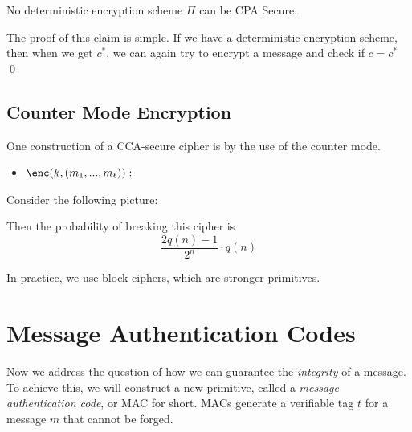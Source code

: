 \documentclass[12pt]{tufte-book}
\newcommand{\getsr}{\xleftarrow{\$}}
\begin{document}
\begin{theorem}
    No deterministic encryption scheme $\Pi$ can be CPA Secure.
\end{theorem}

\proof
The proof of this claim is simple.
If we have a deterministic encryption scheme, then when we get $c^*$, we can again try to encrypt a message and check if $c = c^*$
\qed


\subsection{Counter Mode Encryption}
One construction of a CCA-secure cipher is by the use of the counter mode.

\begin{itemize}
    \item $\enc(k, (m_1,...,m_\ell)):$
\end{itemize}

Consider the following picture:

\begin{center}
\end{center}

Then the probability of breaking this cipher is
$$\frac{2q(n) - 1}{2^n} \cdot q(n)$$

In practice, we use block ciphers, which are stronger primitives.

\section{Message Authentication Codes}
Now we address the question of how we can guarantee the \textit{integrity} of a message.
To achieve this, we will construct a new primitive, called a \textit{message authentication code}, or MAC for short. MACs generate a verifiable tag $t$ for a message $m$ that cannot be forged.
\end{document}
